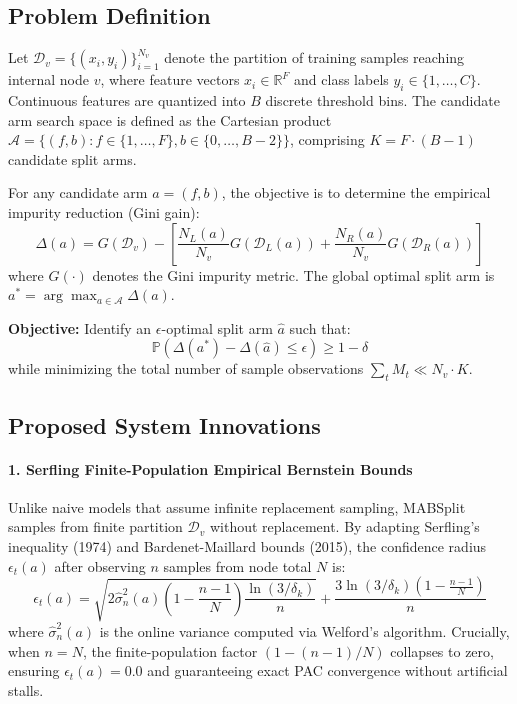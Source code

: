\documentclass{article}
\begin{document}
	\subsection{Problem Definition}
	Let $\mathcal{D}_v = \{(x_i, y_i)\}_{i=1}^{N_v}$ denote the partition of training samples reaching internal node $v$, where feature vectors $x_i \in \mathbb{R}^F$ and class labels $y_i \in \{1, \dots, C\}$. Continuous features are quantized into $B$ discrete threshold bins. The candidate arm search space is defined as the Cartesian product $\mathcal{A} = \{(f, b) : f \in \{1, \dots, F\}, b \in \{0, \dots, B-2\}\}$, comprising $K = F \cdot (B-1)$ candidate split arms.

	For any candidate arm $a = (f, b)$, the objective is to determine the empirical impurity reduction (Gini gain):
	\begin{equation}
		\Delta(a) = G(\mathcal{D}_v) - \left[ \frac{N_L(a)}{N_v} G(\mathcal{D}_L(a)) + \frac{N_R(a)}{N_v} G(\mathcal{D}_R(a)) \right]
	\end{equation}
	where $G(\cdot)$ denotes the Gini impurity metric. The global optimal split arm is $a^* = \arg\max_{a \in \mathcal{A}} \Delta(a)$.
	
	\textbf{Objective:} Identify an $\epsilon$-optimal split arm $\widehat{a}$ such that:
	\begin{equation}
		\mathbb{P}\left( \Delta(a^*) - \Delta(\widehat{a}) \le \epsilon \right) \ge 1 - \delta
	\end{equation}
	while minimizing the total number of sample observations $\sum_{t} M_t \ll N_v \cdot K$.

	\subsection{Proposed System Innovations}
	\paragraph{1. Serfling Finite-Population Empirical Bernstein Bounds}
	Unlike naive models that assume infinite replacement sampling, MABSplit samples from finite partition $\mathcal{D}_v$ without replacement. By adapting Serfling's inequality (1974) and Bardenet-Maillard bounds (2015), the confidence radius $\epsilon_t(a)$ after observing $n$ samples from node total $N$ is:
	\begin{equation}
		\epsilon_t(a) = \sqrt{2 \widehat{\sigma}_n^2(a) \left(1 - \frac{n-1}{N}\right) \frac{\ln(3/\delta_k)}{n}} + \frac{3 \ln(3/\delta_k) \left(1 - \frac{n-1}{N}\right)}{n}
	\end{equation}
	where $\widehat{\sigma}_n^2(a)$ is the online variance computed via Welford's algorithm. 
	Crucially, when $n = N$, the finite-population factor $(1 - (n-1)/N)$ collapses to zero, ensuring $\epsilon_t(a) = 0.0$ and guaranteeing exact PAC convergence without artificial stalls.
\end{document}
